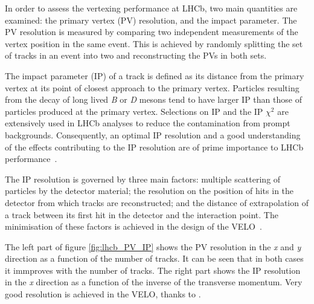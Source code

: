 In order to assess the vertexing performance at LHCb, two main quantities are examined: the primary vertex (PV) resolution, and the impact parameter. The PV resolution is measured by comparing two independent measurements of the vertex position in the same event. This is achieved by randomly splitting the set of tracks in an event into two and reconstructing the PVs in both sets. 

The impact parameter (IP) of a track is defined as its distance from the primary vertex
at its point of closest approach to the primary vertex. Particles resulting from the decay
of long lived \textit{B} or \textit{D} mesons tend to have larger IP than those of particles produced at the primary vertex. Selections on IP and the IP $\chi^2$ are extensively used in LHCb analyses to reduce the contamination from prompt backgrounds. Consequently, an optimal IP resolution and a good understanding of the effects contributing to the IP resolution are of prime importance to LHCb performance~\cite{Aaij:2014jba}.

The IP resolution is governed by three main factors: multiple scattering of particles by
the detector material; the resolution on the position of hits in the detector from which
tracks are reconstructed; and the distance of extrapolation of a track between its first hit in the detector and the interaction point. The minimisation of these factors is achieved in the design of the VELO~\cite{Aaij:2014jba}. %

The left part of figure \ref{fig:lhcb_PV_IP} shows the PV resolution in the \textit{x} and \textit{y} direction as a function of the number of tracks. It can be seen that in both cases it immproves with the number of tracks. The right part shows the IP resolution in the \textit{x} direction as a function of the inverse of the transverse momentum. Very good resolution is achieved in the VELO, thanks to . 

